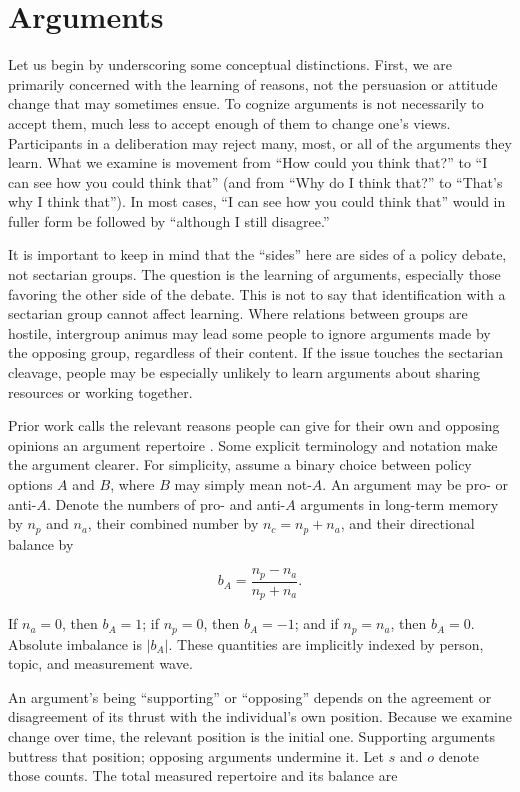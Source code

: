 \documentclass[11pt]{article}
\begin{document}
\section{Arguments}

Let us begin by underscoring some conceptual distinctions. First, we are primarily concerned
with the learning of reasons, not the persuasion or attitude change that may sometimes ensue.
To cognize arguments is not necessarily to accept them, much less to accept enough of them to
change one's views. Participants in a deliberation may reject many, most, or all of the
arguments they learn. What we examine is movement from ``How could you think that?'' to ``I
can see how you could think that'' (and from ``Why do I think that?'' to ``That's why I think
that''). In most cases, ``I can see how you could think that'' would in fuller form be followed
by ``although I still disagree.''

It is important to keep in mind that the ``sides'' here are sides of a policy debate, not
sectarian groups. The question is the learning of arguments, especially those favoring the
other side of the debate. This is not to say that identification with a sectarian group cannot
affect learning. Where relations between groups are hostile, intergroup animus may lead some
people to ignore arguments made by the opposing group, regardless of their content. If the
issue touches the sectarian cleavage, people may be especially unlikely to learn arguments
about sharing resources or working together.

Prior work calls the relevant reasons people can give for their own and opposing opinions an
argument repertoire \citep{cappella2002argument}. Some explicit terminology and notation
make the argument clearer. For simplicity, assume a binary choice between policy options $A$
and $B$, where $B$ may simply mean not-$A$. An argument may be pro- or anti-$A$. Denote the
numbers of pro- and anti-$A$ arguments in long-term memory by $n_p$ and $n_a$, their combined
number by $n_c=n_p+n_a$, and their directional balance by

\begin{equation}
b_A=\frac{n_p-n_a}{n_p+n_a}.
\end{equation}

If $n_a=0$, then $b_A=1$; if $n_p=0$, then $b_A=-1$; and if $n_p=n_a$, then
$b_A=0$. Absolute imbalance is $|b_A|$. These quantities are implicitly indexed by person,
topic, and measurement wave.

An argument's being ``supporting'' or ``opposing'' depends on the agreement or disagreement of
its thrust with the individual's own position. Because we examine change over time, the
relevant position is the initial one. Supporting arguments buttress that position; opposing
arguments undermine it. Let $s$ and $o$ denote those counts. The total measured repertoire and
its balance are
\end{document}
